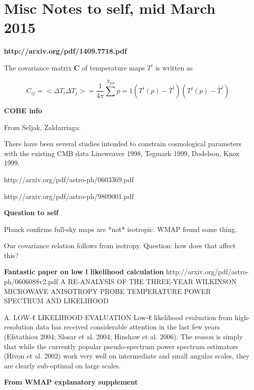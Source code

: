 \documentclass[a4paper, 11pt]{article}
\begin{document}



\section*{Misc Notes to self, mid March 2015}

\textbf{http://arxiv.org/pdf/1409.7718.pdf}

The covariance matrix \textbf{C} of temperature maps $T^i$ is written as

$$
C_{ij}=<\Delta T_i\Delta T_j>=\frac{1}{4\pi}\sum^{N_\text{pix}}{p=1}( T^{i}(p)-\bar{T}^{i})( T^{j}(p)-\bar{T}^{j})
$$

\textbf{COBE info}

From Seljak, Zaldarriaga:

There have been several studies intended to constrain cosmological parameters with the existing CMB
data Lineweaver 1998, Tegmark 1999, Dodelson, Knox 1999. 


http://arxiv.org/pdf/astro-ph/0603369.pdf

http://arxiv.org/pdf/astro-ph/9809001.pdf

\textbf{Question to self}

Planck confirms full-sky maps are *not* isotropic. WMAP found same thing. 

Our covariance relation follows from isotropy. Question: how does that affect this? 




\textbf{Fantastic paper on low l likelihood calculation}
http://arxiv.org/pdf/astro-ph/0606088v2.pdf
A RE-ANALYSIS OF THE THREE-YEAR WILKINSON MICROWAVE ANISOTROPY PROBE
TEMPERATURE POWER SPECTRUM AND LIKELIHOOD

A. LOW-ℓ LIKELIHOOD EVALUATION
Low-ℓ likelihood evaluation from high-resolution data has received considerable attention in the last few years
(Efstathiou 2004; Slosar et al. 2004; Hinshaw et al. 2006). The reason is simply that while the currently popular
pseudo-spectrum power spectrum estimators (Hivon et al. 2002) work very well on intermediate and small angular
scales, they are clearly sub-optimal on large scales.



\textbf{From WMAP explanatory supplement}
\end{document}
